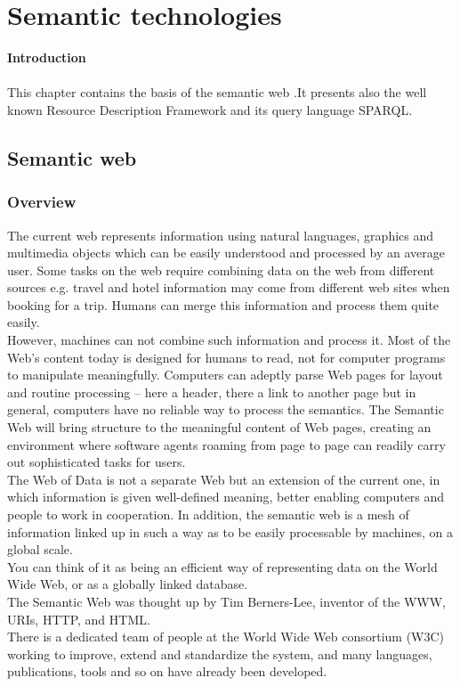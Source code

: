 \documentclass[a4paper,12pt,oneside]{report}
\begin{document}
{\chapter{Semantic technologies}
\textbf{\large Introduction}\\ \\
{This chapter contains the basis of the semantic web .It presents also the well known Resource Description Framework and its query language SPARQL.}
\section{Semantic web}
\label{sec:sem}
\subsection{Overview}
{       The current web represents information using natural languages, graphics and multimedia objects which can be easily understood and processed by an average user. Some tasks on the web require combining data on the web from different sources e.g. travel and hotel information may come from different web sites when booking for a trip. Humans can merge this information and process them quite easily.\\
 However, machines can not combine such information and process it. Most of the Web’s content today is designed for humans to read, not for computer programs to manipulate meaningfully. Computers can adeptly parse Web pages for layout and routine processing – here a header, there a link to another page but in general, computers have no reliable way to process the semantics.
The Semantic Web will bring structure to the meaningful content of Web pages, creating an environment where software agents roaming from page to page can readily carry out sophisticated tasks for users.\\
The  Web of Data is not a separate Web but an extension of the current one, in which information is given well-defined meaning, better enabling computers and people to work in cooperation.
In addition, the semantic web  is a mesh of information linked up in such a way as to be easily processable by machines, on a global scale.\\
You can think of it as being an efficient way of representing data on the World Wide Web, or as a globally linked database.\\
The Semantic Web was thought up by Tim Berners-Lee, inventor of the WWW, URIs, HTTP, and HTML.\\
There is a dedicated team of people at the World Wide Web consortium (W3C) working to improve, extend and standardize the system, and many languages, publications, tools and so on have already been developed. \\
}}
\end{document}

